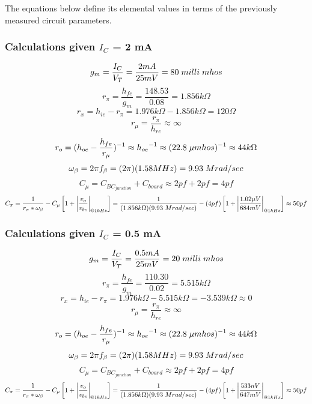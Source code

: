 \documentclass{article}
\begin{document}
	\noindent The equations below define its elemental values in terms of the previously measured circuit parameters.
	
	\pagebreak
	
	\subsubsection{Calculations given $I_C$ = 2 mA}
	\vspace{0.5cm}
	$$g_m = \frac{I_C}{V_T} = \frac{2mA}{25mV} = 80 \hspace{1mm} milli \hspace{1mm} mhos$$
	$$r_{\pi} = \frac{h_{fe}}{g_m} = \frac{148.53}{0.08} = 1.856 k\Omega$$
	$$r_x = h_{ie} - r_{\pi} = 1.976 k\Omega - 1.856 k\Omega = 120\Omega$$
	$$r_{\mu} = \frac{r_{\pi}}{h_{re}} \approx \infty$$
	$$r_o = (h_{oe} - \frac{h_{fe}}{r_{\mu}})^{-1} \approx {h_{oe}}^{-1} \approx (22.8 \hspace{1mm} \mu mhos)^{-1} \approx 44 k\Omega$$
	$$\omega_{\beta} = 2\pi f_{\beta} = (2\pi) (1.58 MHz) = 9.93 \hspace{1mm} Mrad/sec$$
	$$C_{\mu} = C_{BC_{junction}} + C_{board} \approx 2pf + 2pf = 4pf$$
	$$C_{\pi} = \frac{1}{r_{\pi} * \omega_{\beta}} - C_{\mu} \left [ 1 + \left | \frac{v_o}{v_{be}} \right |_{@ 1kHz} \right ] = \frac{1}{(1.856 k\Omega) (9.93 \hspace{1mm} Mrad/sec)} - (4pf) \left [ 1 + \left | \frac{1.02 \mu V}{684mV} \right |_{@ 1kHz} \right ] \approx 50pf$$
	
	\pagebreak
	
	\subsubsection{Calculations given $I_C$ = 0.5 mA}
	\vspace{0.5cm}
	$$g_m = \frac{I_C}{V_T} = \frac{0.5mA}{25mV} = 20 \hspace{1mm} milli \hspace{1mm} mhos$$
	$$r_{\pi} = \frac{h_{fe}}{g_m} = \frac{110.30}{0.02} = 5.515 k\Omega$$
	$$r_x = h_{ie} - r_{\pi} = 1.976 k\Omega - 5.515 k\Omega = - 3.539 k\Omega \approx 0$$
	$$r_{\mu} = \frac{r_{\pi}}{h_{re}} \approx \infty$$
	$$r_o = (h_{oe} - \frac{h_{fe}}{r_{\mu}})^{-1} \approx {h_{oe}}^{-1} \approx (22.8 \hspace{1mm} \mu mhos)^{-1} \approx 44 k\Omega$$
	$$\omega_{\beta} = 2\pi f_{\beta} = (2\pi) (1.58 MHz) = 9.93 \hspace{1mm} Mrad/sec$$
	$$C_{\mu} = C_{BC_{junction}} + C_{board} \approx 2pf + 2pf = 4pf$$
	$$C_{\pi} = \frac{1}{r_{\pi} * \omega_{\beta}} - C_{\mu} \left [ 1 + \left | \frac{v_o}{v_{be}} \right |_{@ 1kHz} \right ] = \frac{1}{(1.856 k\Omega) (9.93 \hspace{1mm} Mrad/sec)} - (4pf) \left [ 1 + \left | \frac{533nV}{647mV} \right |_{@ 1kHz} \right ] \approx 50pf$$
	
\end{document}
